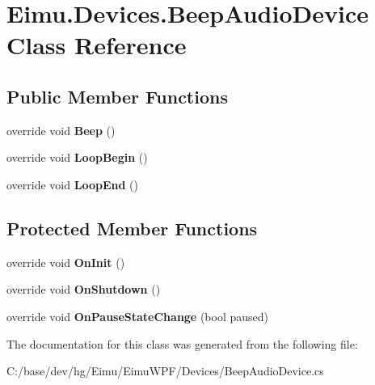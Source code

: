 \hypertarget{class_eimu_1_1_devices_1_1_beep_audio_device}{
\section{Eimu.Devices.BeepAudioDevice Class Reference}
\label{class_eimu_1_1_devices_1_1_beep_audio_device}
}
\subsection*{Public Member Functions}
\begin{DoxyCompactItemize}
\item 
\hypertarget{class_eimu_1_1_devices_1_1_beep_audio_device_afb2cf6656e3eb15df8edfb318e2fa12f}{
override void {\bfseries Beep} ()}
\label{class_eimu_1_1_devices_1_1_beep_audio_device_afb2cf6656e3eb15df8edfb318e2fa12f}

\item 
\hypertarget{class_eimu_1_1_devices_1_1_beep_audio_device_a47493b7b22c27a83932ade394bc232c3}{
override void {\bfseries LoopBegin} ()}
\label{class_eimu_1_1_devices_1_1_beep_audio_device_a47493b7b22c27a83932ade394bc232c3}

\item 
\hypertarget{class_eimu_1_1_devices_1_1_beep_audio_device_a7037f32c2038873209f8d96f34d8d0f6}{
override void {\bfseries LoopEnd} ()}
\label{class_eimu_1_1_devices_1_1_beep_audio_device_a7037f32c2038873209f8d96f34d8d0f6}

\end{DoxyCompactItemize}
\subsection*{Protected Member Functions}
\begin{DoxyCompactItemize}
\item 
\hypertarget{class_eimu_1_1_devices_1_1_beep_audio_device_a60e559298d343a450672747359e0ce8d}{
override void {\bfseries OnInit} ()}
\label{class_eimu_1_1_devices_1_1_beep_audio_device_a60e559298d343a450672747359e0ce8d}

\item 
\hypertarget{class_eimu_1_1_devices_1_1_beep_audio_device_a55e066cdab9250f3d72616c7c05aeda1}{
override void {\bfseries OnShutdown} ()}
\label{class_eimu_1_1_devices_1_1_beep_audio_device_a55e066cdab9250f3d72616c7c05aeda1}

\item 
\hypertarget{class_eimu_1_1_devices_1_1_beep_audio_device_a3c70327346ebab1dc9d992c685623a90}{
override void {\bfseries OnPauseStateChange} (bool paused)}
\label{class_eimu_1_1_devices_1_1_beep_audio_device_a3c70327346ebab1dc9d992c685623a90}

\end{DoxyCompactItemize}


The documentation for this class was generated from the following file:\begin{DoxyCompactItemize}
\item 
C:/base/dev/hg/Eimu/EimuWPF/Devices/BeepAudioDevice.cs\end{DoxyCompactItemize}
